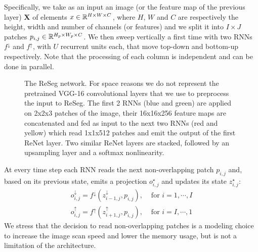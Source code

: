 Specifically, we take as an input an image (or the feature map of the previous
layer) $\mathbf{X}$ of elements $x \in \mathbb{R}^{H \times W \times C}$, where $H$,
$W$ and $C$ are respectively the height, width and number of channels (or
features) and we split it into $I \times J$ patches $p_{i,j} \in \mathbb{R}^{H_p
\times W_p \times C}$. We then sweep %
vertically a first time with two RNNs $f^{\downarrow}$ and $f^{\uparrow}$,
with $U$ recurrent units each, that move top-down and bottom-up respectively.
Note that the processing of each column is independent and can be done in
parallel.

\begin{figure}[t]
    \advance{}\textwidth
    \centering
    \caption{The ReSeg network. For space reasons we do not represent the
        pretrained VGG-16 convolutional layers that we use to preprocess
        the input to ReSeg. The first 2 RNNs (blue and green) are applied on
        2x2x3 patches of the image, their 16x16x256 feature maps are
        concatenated and fed as input to the next two RNNs (red and yellow)
        which read 1x1x512 patches and emit the output of the first ReNet
        layer. Two similar ReNet layers are stacked, followed by an upsampling
        layer and a softmax nonlinearity.}
    \label{fig:ReSeg}
\end{figure}

At every time step each RNN reads the next non-overlapping patch
$p_{i,j}$ and, based on its previous
state, emits a projection $o_{i,j}^{\star}$ and updates its state
$z_{i,j}^{\star}$:
\begin{align}
    o^{\downarrow}_{i,j} = f^{\downarrow}(z^{\downarrow}_{i-1,j},p_{i,j}),
        &\text{ for }i=1,\cdots, I\\
    o^{\uparrow}_{i,j} = f^{\uparrow}(z^{\uparrow}_{i+1,j},p_{i,j}),
        &\text{ for }i=I,\cdots,1
\end{align}
We stress that the decision to read non-overlapping patches is a modeling
choice to increase the image scan speed and lower the memory usage, but is not
a limitation of the architecture.

